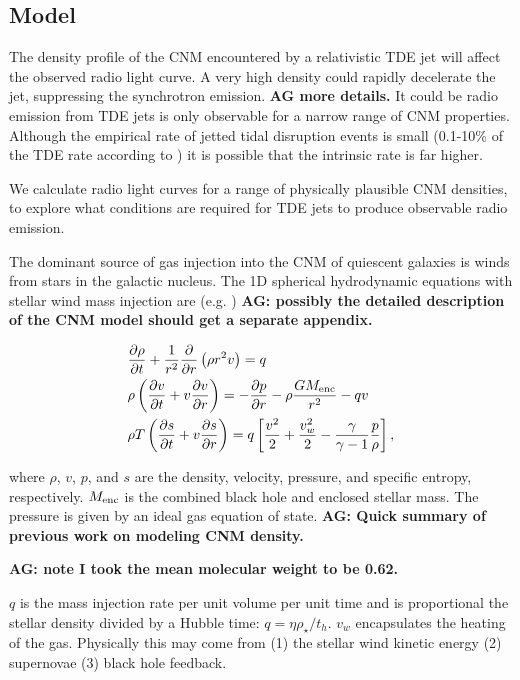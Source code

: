 \documentclass[usenatbib,fleqn]{mnras}
\newcommand{\Menc}{M_{\rm enc}}
\renewcommand{\th}{t_h}
\begin{document}
\subsection{Model}

The density profile of the CNM encountered by a relativistic TDE jet
will affect the observed radio light curve. A very high density could
rapidly decelerate the jet, suppressing the synchrotron emission.
{\bf AG more details.}  It could be radio emission from TDE jets is
only observable for a narrow range of CNM properties. Although the
empirical rate of jetted tidal disruption events is small (0.1-10\% of
the TDE rate according to \citealt{van-Velzen+2013}) it is possible
that the intrinsic rate is far higher.

We calculate radio light curves for a range of physically plausible
CNM densities, to explore what conditions are required for TDE jets to
produce observable radio emission. 

The dominant source of gas injection into the CNM of quiescent
galaxies is winds from stars in the galactic nucleus. The 1D spherical
hydrodynamic equations with stellar wind mass injection are
(e.g. \citealt{Holzer+1970}) {\bf AG: possibly the detailed
  description of the CNM model should get a separate appendix.}


\begin{align}
  &\frac{\partial \rho}{\partial t}+\frac{1}{r^2}\frac{\partial}{\partial r}\left(\rho r^2 v\right)=q \label{eq:drhodt}\\
  &\rho \left(\frac{\partial v}{\partial t} + v\frac{\partial
      v}{\partial r}\right) =-\frac{\partial p}{\partial r}- \rho\frac{GM_{\rm enc}}{r^{2}} -q v \label{eq:dvdt}\\
  &\rho T\left(\frac{\partial s}{\partial t} + v\frac{\partial
      s}{\partial
      r}\right)=q\left[\frac{v^2}{2}+\frac{v_w^2}{2}-\frac{\gamma}{\gamma-1}
    \frac{p}{\rho} \right] ,
\label{eq:dsdt}
\end{align}

where $\rho$, $v$, $p$, and $s$ are the density, velocity, pressure, and
specific entropy, respectively.  $\Menc$ is the combined black hole
and enclosed stellar mass. The pressure is given by an ideal gas
equation of state.  {\bf AG: Quick summary of previous work on
  modeling CNM density.}

 {\bf AG: note I took the mean molecular weight to be
  0.62.}

$q$ is the mass injection rate per unit volume per unit time and is
proportional the stellar density divided by a Hubble time: $q=\eta
\rho_\star/\th$. $v_w$ encapsulates the heating of the gas. Physically
this may come from (1) the stellar wind kinetic energy (2) supernovae
(3) black hole feedback.
\end{document}

